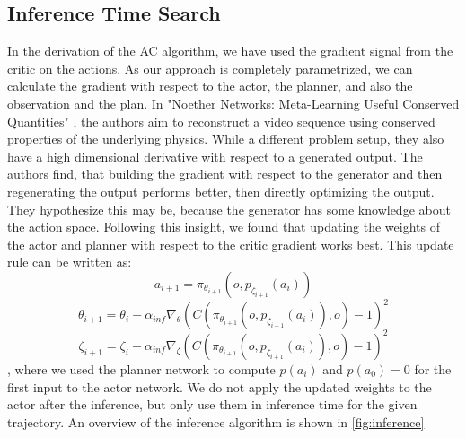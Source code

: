\subsection{Inference Time Search}
\label{sec:inf_time_search}
In the derivation of the AC algorithm, we have used the gradient signal from the critic on the actions. As our approach is completely parametrized, we can calculate 
the gradient with respect to the actor, the planner, and also the observation and the plan. In "Noether Networks: Meta-Learning Useful Conserved Quantities" \cite{https://arxiv.org/abs/2112.03321}, 
the authors aim to reconstruct a video sequence 
using conserved properties of the underlying physics. While a different problem setup, they also have a high dimensional derivative with respect to a 
generated output. The authors find, that 
building the gradient with respect to the generator and then regenerating the output performs better, then directly optimizing the output. They hypothesize this 
may be, because the generator has some knowledge about the action space. Following this insight, we found that updating the weights of the actor and planner 
with respect to the critic gradient works best. This update rule can be written as:
\begin{equation}
    a_{i+1} = \pi_{\theta_{i+1}}(o, p_{\zeta_{i+1}}(a_i))
\end{equation}
\begin{equation*}
    \theta_{i+1} = \theta_i - \alpha_{inf} \nabla_{\theta} (C(\pi_{\theta_{i+1}}(o, p_{\zeta_{i+1}}(a_i)), o) - 1)^2
\end{equation*}
\begin{equation*}
    \zeta_{i+1} = \zeta_i - \alpha_{inf} \nabla_{\zeta} (C(\pi_{\theta_{i+1}}(o, p_{\zeta_{i+1}}(a_i)), o) - 1)^2
\end{equation*}
, where we used the planner network to compute $p(a_i)$ and $p(a_0) = 0$ for the first input to the actor network. 
We do not apply the updated weights to the actor after the inference, but only use them in inference time for the given trajectory.  An overview of the inference 
algorithm is shown in \ref{fig:inference}

